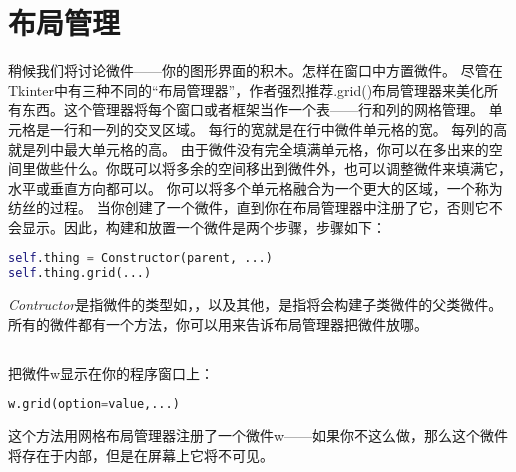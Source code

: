 \documentclass[11pt,a4paper,oneside]{book}
\begin{document}
\chapter[布局管理]{布局管理}%
稍候我们将讨论微件——你的图形界面的积木。怎样在窗口中方置微件。
尽管在Tkinter中有三种不同的“布局管理器”，作者强烈推荐\textsf{.grid()}布局管理器来美化所有东西。这个管理器将每个窗口或者框架当作一个表——行和列的网格管理。
单元格是一行和一列的交叉区域。
每行的宽就是在行中微件单元格的宽。
每列的高就是列中最大单元格的高。
由于微件没有完全填满单元格，你可以在多出来的空间里做些什么。你既可以将多余的空间移出到微件外，也可以调整微件来填满它，水平或垂直方向都可以。
你可以将多个单元格融合为一个更大的区域，一个称为纺丝的过程。
当你创建了一个微件，直到你在布局管理器中注册了它，否则它不会显示。因此，构建和放置一个微件是两个步骤，步骤如下：
\begin{lstlisting}[language=python]
self.thing = Constructor(parent, ...) 
self.thing.grid(...) 
\end{lstlisting}
\textit{\textsf{Contructor}}是指微件的类型如，，以及其他，是指将会构建子类微件的父类微件。所有的微件都有一个方法，你可以用来告诉布局管理器把微件放哪。
\section[.grid()方法]{}%
把微件w显示在你的程序窗口上：
\begin{lstlisting}[language=python]
w.grid(option=value,...)
\end{lstlisting}
\par{这个方法用网格布局管理器注册了一个微件w——如果你不这么做，那么这个微件将存在于内部，但是在屏幕上它将不可见。}
\end{document}
